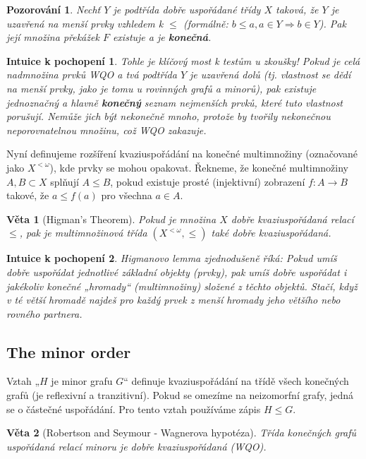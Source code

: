 \documentclass[a4paper,11pt]{article}
\newtheorem{theorem}{Věta}[section]
\newtheorem{observation}{Pozorování}[section]
\newtheorem*{intuition}{Intuice k pochopení}
\begin{document}
\begin{observation}
Nechť $Y$ je podtřída dobře uspořádané třídy $X$ taková, že $Y$ je uzavřená na menší prvky vzhledem k $\le$ (formálně: $b \le a, a \in Y \Rightarrow b \in Y$). Pak její množina překážek $F$ existuje a je \textbf{konečná}.
\end{observation}

\begin{intuition}
Tohle je klíčový most k testům u zkoušky! Pokud je celá nadmnožina prvků WQO a tvá podtřída $Y$ je uzavřená dolů (tj. vlastnost se dědí na menší prvky, jako je tomu u rovinných grafů a minorů), pak existuje jednoznačný a hlavně \textbf{konečný} seznam nejmenších prvků, které tuto vlastnost porušují. Nemůže jich být nekonečně mnoho, protože by tvořily nekonečnou neporovnatelnou množinu, což WQO zakazuje.
\end{intuition}

Nyní definujeme rozšíření kvaziuspořádání na konečné multimnožiny (označované jako $X^{<\omega}$), kde prvky se mohou opakovat. Řekneme, že konečné multimnožiny $A, B \subset X$ splňují $A \le B$, pokud existuje prosté (injektivní) zobrazení $f: A \to B$ takové, že $a \le f(a)$ pro všechna $a \in A$.

\begin{theorem}[Higman's Theorem]
Pokud je množina $X$ dobře kvaziuspořádaná relací $\le$, pak je multimnožinová třída $(X^{<\omega}, \le)$ také dobře kvaziuspořádaná.
\end{theorem}

\begin{intuition}
Higmanovo lemma zjednodušeně říká: Pokud umíš dobře uspořádat jednotlivé základní objekty (prvky), pak umíš dobře uspořádat i jakékoliv konečné „hromady“ (multimnožiny) složené z těchto objektů. Stačí, když v té větší hromadě najdeš pro každý prvek z menší hromady jeho většího nebo rovného partnera.
\end{intuition}

\subsection{The minor order}

Vztah „$H$ je minor grafu $G$“ definuje kvaziuspořádání na třídě všech konečných grafů (je reflexivní a tranzitivní). Pokud se omezíme na neizomorfní grafy, jedná se o částečné uspořádání. Pro tento vztah používáme zápis $H \le G$.

\begin{theorem}[Robertson and Seymour - Wagnerova hypotéza]
Třída konečných grafů uspořádaná relací minoru je dobře kvaziuspořádaná (WQO).
\end{theorem}
\end{document}
